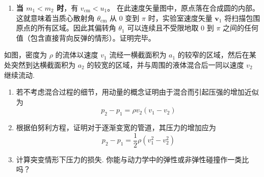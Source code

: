 \begin{solution}
\begin{enumerate}
    \item[(c)] \textbf{当 $m_1 < m_2$ 时}，有 $v_{\text{cm}} < u_1$。
    在此速度矢量图中，原点落在合成圆的内部。这就意味着当质心散射角 $\theta_{\text{cm}}$ 从 $0$ 变到 $\pi$ 时，实验室速度矢量 $\boldsymbol{v}_1$ 将扫描包围原点的所有区域。因此其偏转角 $\theta_1$ 可以连续且不受限地取 $0$ 到 $\pi$ 之间的任何值（包含直接背向反弹的情形）。证明完毕。
\end{enumerate}
\end{solution}

\begin{exercise}\label{ex:5.12}
如图，密度为 $\rho$ 的流体以速度 $v_1$ 流经一横截面积为 $a_1$ 的较窄的区域，然后在某处突然到达横截面积为 $a_2$ 的较宽的区域，并与周围的液体混合后一同以速度 $v_2$ 继续流动.
\begin{enumerate}
  \item[(a)] 若不考虑混合过程的细节，用动量的概念证明由于混合而引起压强的增加近似为
  $$ p_2 - p_1 = \rho v_2 (v_1 - v_2) $$
  \item[(b)] 根据伯努利方程，证明对于逐渐变宽的管道，其压力的增加应为
  $$ p_2 - p_1 = \frac{1}{2} \rho (v_1^2 - v_2^2) $$
  \item[(c)] 计算突变情形下压力的损失. 你能与动力学中的弹性或非弹性碰撞作一类比吗？
\end{enumerate}
\begin{center}
\end{center}
\end{exercise}

